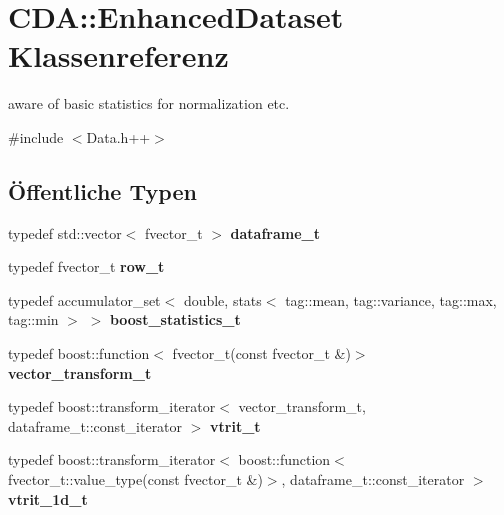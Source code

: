 \hypertarget{classCDA_1_1EnhancedDataset}{
\section{CDA::EnhancedDataset Klassenreferenz}
\label{classCDA_1_1EnhancedDataset}
}


aware of basic statistics for normalization etc.  




{\ttfamily \#include $<$Data.h++$>$}

\subsection*{Öffentliche Typen}
\begin{DoxyCompactItemize}
\item 
\hypertarget{classCDA_1_1EnhancedDataset_ac48f706bc85385da7b78ff9229666475}{
typedef std::vector$<$ fvector\_\-t $>$ {\bfseries dataframe\_\-t}}
\label{classCDA_1_1EnhancedDataset_ac48f706bc85385da7b78ff9229666475}

\item 
\hypertarget{classCDA_1_1EnhancedDataset_ad01be5e014bc9a5232102fae6759caad}{
typedef fvector\_\-t {\bfseries row\_\-t}}
\label{classCDA_1_1EnhancedDataset_ad01be5e014bc9a5232102fae6759caad}

\item 
\hypertarget{classCDA_1_1EnhancedDataset_ad125a62150f81238cd207baaa057b4ff}{
typedef accumulator\_\-set$<$ double, stats$<$ tag::mean, tag::variance, tag::max, tag::min $>$ $>$ {\bfseries boost\_\-statistics\_\-t}}
\label{classCDA_1_1EnhancedDataset_ad125a62150f81238cd207baaa057b4ff}

\item 
\hypertarget{classCDA_1_1EnhancedDataset_a93468e65b796f0c5679a735e40ea3c5f}{
typedef boost::function$<$ fvector\_\-t(const fvector\_\-t \&)$>$ {\bfseries vector\_\-transform\_\-t}}
\label{classCDA_1_1EnhancedDataset_a93468e65b796f0c5679a735e40ea3c5f}

\item 
\hypertarget{classCDA_1_1EnhancedDataset_a47a10eb08e8ab193f801e5a82a3d7a36}{
typedef boost::transform\_\-iterator$<$ vector\_\-transform\_\-t, dataframe\_\-t::const\_\-iterator $>$ {\bfseries vtrit\_\-t}}
\label{classCDA_1_1EnhancedDataset_a47a10eb08e8ab193f801e5a82a3d7a36}

\item 
\hypertarget{classCDA_1_1EnhancedDataset_aea3187cde8e4548c48cb238e571563e7}{
typedef boost::transform\_\-iterator$<$ boost::function$<$ fvector\_\-t::value\_\-type(const fvector\_\-t \&)$>$, dataframe\_\-t::const\_\-iterator $>$ {\bfseries vtrit\_\-1d\_\-t}}
\label{classCDA_1_1EnhancedDataset_aea3187cde8e4548c48cb238e571563e7}

\end{DoxyCompactItemize}
